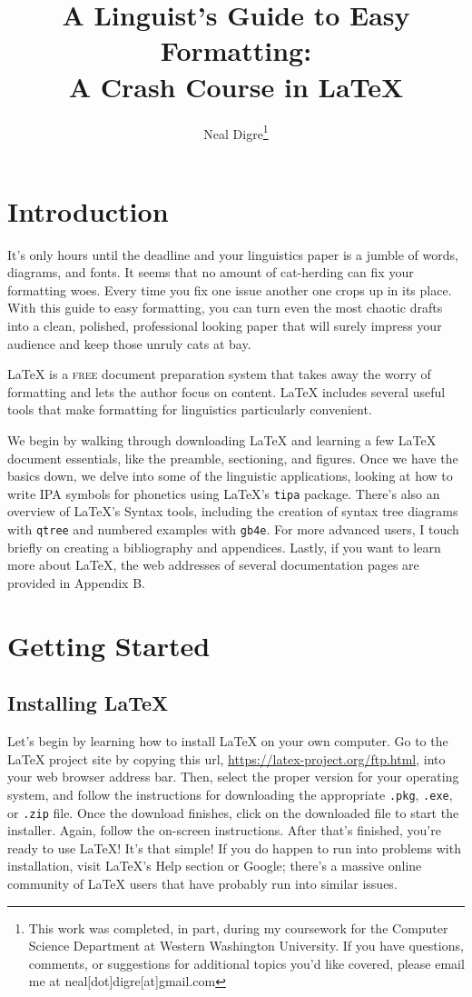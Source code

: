\documentclass[12pt]{article}
\title{A Linguist's Guide to Easy Formatting: \\
\large A Crash Course in \LaTeX \vspace{-2ex}}
\author{Neal Digre\thanks{This work was completed, in part, during my coursework for the Computer Science Department at Western Washington University. If you have questions, comments, or suggestions for additional topics you'd like covered, please email me at neal[dot]digre[at]gmail.com} \vspace{-2ex}}
\date{}
\begin{document}
\maketitle
\pagestyle{fancy}

\section{Introduction}

It's only hours until the deadline and your linguistics paper is a jumble of words, diagrams, and fonts. It seems that no amount of cat-herding can fix your formatting woes. Every time you fix one issue another one crops up in its place. With this guide to easy formatting, you can turn even the most chaotic drafts into a clean, polished, professional looking paper that will surely impress your audience and keep those unruly cats at bay.

{\LaTeX} is a \textsc{free} document preparation system that takes away the worry of formatting and lets the author focus on content. {\LaTeX} includes several useful tools that make formatting for linguistics particularly convenient.

We begin by walking through downloading {\LaTeX} and learning a few {\LaTeX} document essentials, like the preamble, sectioning, and figures. Once we have the basics down, we delve into some of the linguistic applications, looking at how to write IPA symbols for phonetics using {\LaTeX}'s \verb!tipa! package. There's also an overview of {\LaTeX}'s Syntax tools, including the creation of syntax tree diagrams with \verb!qtree! and numbered examples with \verb!gb4e!. For more advanced users, I touch briefly on creating a bibliography and appendices. Lastly, if you want to learn more about {\LaTeX}, the web addresses of several documentation pages are provided in Appendix B.

\section{Getting Started} 
\subsection{Installing \LaTeX}

Let's begin by learning how to install {\LaTeX} on your own computer. Go to the {\LaTeX} project site by copying this url, \url{https://latex-project.org/ftp.html}, into your web browser address bar. Then, select the proper version for your operating system, and follow the instructions for downloading the appropriate \verb!.pkg!, \verb!.exe!, or \verb!.zip! file. Once the download finishes, click on the downloaded file to start the installer. Again, follow the on-screen instructions. After that's finished, you're ready to use {\LaTeX}! It's that simple! If you do happen to run into problems with installation, visit {\LaTeX}'s Help section or Google; there's a massive online community of {\LaTeX} users that have probably run into similar issues.
\end{document}

